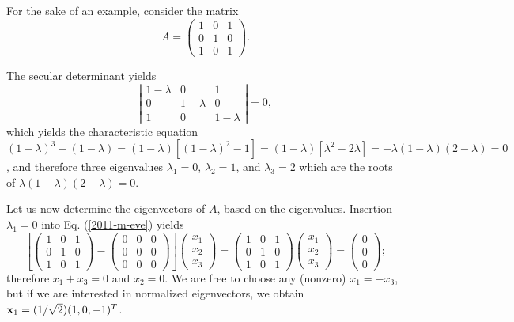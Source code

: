 {\color{blue}
\bexample
For the sake of an example, consider  the
{matrix}
\begin{equation}
A=
\left(
\begin{array}{rrrr}
1&0&1\\
0&1&0\\
1&0&1
\end{array}
\right).
\end{equation}

The secular determinant yields
$$
\left|
\begin{array}{ccccc}
1-\lambda &0&1\\
0&1-\lambda &0\\
1&0&1-\lambda
\end{array}
\right| = 0,
$$
which yields the characteristic equation
$
(1-\lambda )^3 -(1-\lambda ) =(1-\lambda )[(1-\lambda )^2 - 1]=(1-\lambda )[\lambda ^2 - 2\lambda ]= - \lambda (1-\lambda )(2-\lambda ) =0$,
and therefore three  eigenvalues
$\lambda_1=0$,
$\lambda_2=1$, and
$\lambda_3=2$ which are the roots of $\lambda (1-\lambda )(2-\lambda ) =0$.

Let us now determine the eigenvectors of $A$, based on the eigenvalues.
Insertion  $\lambda_1=0$ into Eq. (\ref{2011-m-eve}) yields
\begin{equation}
\left[
\left(
\begin{array}{rrrr}
1&0&1\\
0&1&0\\
1&0&1
\end{array}
\right)  -
\left(
\begin{array}{rrrr}
0&0&0\\
0&0&0\\
0&0&0
\end{array}
\right)
\right]
\left(
\begin{array}{rrrr}
x_1\\
x_2\\
x_3
\end{array}
\right)
=
\left(
\begin{array}{rrrr}
1&0&1\\
0&1&0\\
1&0&1
\end{array}
\right)
\left(
\begin{array}{rrrr}
x_1\\
x_2\\
x_3
\end{array}
\right)
=
\left(
\begin{array}{rrrr}
0\\
0\\
0
\end{array}
\right)
;
\end{equation}
therefore $x_1+x_3=0$ and $x_2=0$.
We are free to choose any (nonzero) $x_1=-x_3$,
but if we are interested in normalized eigenvectors, we obtain
${\bf x}_1 =(1/\sqrt{2})(1,0,-1)^T$.

}

